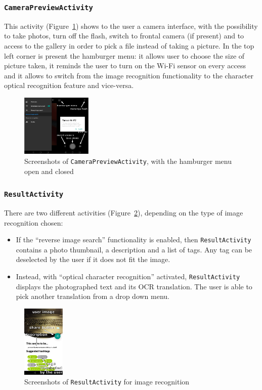 \subsubsection{\texttt{CameraPreviewActivity}}
This activity (Figure~\ref{fig:mainActivity}) shows to the user a camera
interface, with the possibility to take photos, turn off the flash, switch to
frontal camera (if present) and to access to the gallery in order to pick a file
instead of taking a picture. In the top left corner is present the hamburger
menu: it allows user to choose the size of picture taken, it reminds the user to
turn on the Wi-Fi sensor on every access and it allows to switch from the image
recognition functionality to the character optical recognition feature and
vice-versa.
\begin{figure}[h]
    \centering
    \includegraphics[width=0.30\textwidth]{../img/main_activity}
    \caption{Screenshots of \texttt{CameraPreviewActivity}, with the hamburger
menu open and closed}
    \label{fig:mainActivity}
\end{figure}

\subsubsection{\texttt{ResultActivity}}
There are two different activities (Figure~\ref{fig:imageResultActivity}),
depending on the type of image recognition chosen:
\begin{itemize}
        \item If the ``reverse image search'' functionality is enabled, then
\texttt{ResultActivity} contains a photo thumbnail, a description and a list of
tags. Any tag can be deselected by the user if it does not fit the image.
    \item Instead, with ``optical character recognition'' activated,
\texttt{ResultActivity} displays the photographed text and its OCR translation.
The user is able to pick another translation from a drop down menu.
\end{itemize}

\begin{figure}[h]
    \centering
    \includegraphics[width=0.18\textwidth]{../img/image_result_activity}
    \caption{Screenshots of \texttt{ResultActivity} for image recognition}
    \label{fig:imageResultActivity}
\end{figure}

